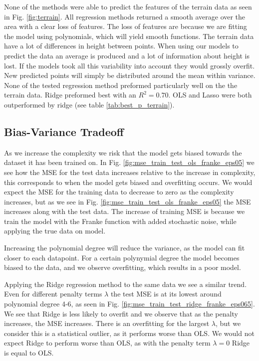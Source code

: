\documentclass[%
 reprint,
nofootinbib,
 amsmath,amssymb,
 aps,
]{revtex4-2}
\begin{document}
None of the methods were able to predict the features of the terrain data as seen in Fig. \ref{fig:terrain}. All regression methods returned a smooth average over the area with a clear loss of features. The loss of features are because we are fitting the model using polynomials, which will yield smooth functions. The terrain data have a lot of differences in height between points. When using our models to predict the data an average is produced and a lot of information about height is lost. If the models took all this variability into account they would grossly overfit. New predicted points will simply be distributed around the mean within variance. None of the tested regression method preformed particularly well on the the terrain data. Ridge preformed best with an $R^2 = 0.70$. OLS and Lasso were both outperformed by ridge (see table \ref{tab:best_p_terrain}).


\subsection{Bias-Variance Tradeoff}
As we increase the complexity we risk that the model gets biased towards the dataset it has been trained on. In Fig. \ref{fig:mse_train_test_ols_franke_eps05} we see how the MSE for the test data increases relative to the increase in complexity, this corresponds to when the model gets biased and overfitting occurs. We would expect the MSE for the training data to decrease to zero as the complexity increases, but as we see in Fig. \ref{fig:mse_train_test_ols_franke_eps05} the MSE increases along with the test data. The increase of training MSE is because we train the model with the Franke function with added stochastic noise, while applying the true data on model.

Increasing the polynomial degree will reduce the variance, as the model can fit closer to each datapoint. For a certain polynymial degree the model becomes biased to the data, and we observe overfitting, which results in a poor model.

Applying the Ridge regression method to the same data we see a similar trend. Even for different penalty terms $\lambda$ the test MSE is at its lowest around polynomial degree 4-6, as seen in Fig. \ref{fig:mse_train_test_ridge_franke_eps065}. We see that Ridge is less likely to overfit and we observe that as the penalty increases, the MSE increases. There is an overfitting for the largest $\lambda$, but we consider this is a statistical outlier, as it performs worse than OLS. We would not expect Ridge to perform worse than OLS, as with the penalty term $\lambda = 0$ Ridge is equal to OLS.
\end{document}
